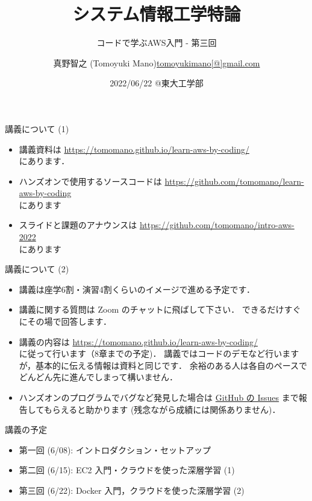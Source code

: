 \documentclass[unicode,11pt]{beamer}
\title{システム情報工学特論}
\subtitle{コードで学ぶAWS入門 - 第三回}
\author[Tomoyuki Mano]{\texorpdfstring{真野智之 (Tomoyuki Mano)\newline\url{tomoyukimano[@]gmail.com}}{Author}}
\institute[OIST]{Okinawa Institute of Science and Technology (OIST)}
\date{2022/06/22 @東大工学部}
\begin{document}
\frame{\titlepage}

\begin{frame}{講義について (1)}
\begin{itemize}
    \item 講義資料は
    \url{https://tomomano.github.io/learn-aws-by-coding/}\\
    にあります．
    \item ハンズオンで使用するソースコードは \url{https://github.com/tomomano/learn-aws-by-coding}\\
    にあります
    \item スライドと課題のアナウンスは
    \url{https://github.com/tomomano/intro-aws-2022}\\
    にあります
\end{itemize}
\end{frame}

\begin{frame}{講義について (2)}
\begin{itemize}
    \item 講義は座学6割・演習4割くらいのイメージで進める予定です．
    \item 講義に関する質問は Zoom のチャットに飛ばして下さい．
    できるだけすぐにその場で回答します．
    \item 講義の内容は
    \url{https://tomomano.github.io/learn-aws-by-coding/}\\
    に従って行います（8章までの予定)．
    講義ではコードのデモなど行いますが，基本的に伝える情報は資料と同じです．
    余裕のある人は各自のペースでどんどん先に進んでしまって構いません．
    \item ハンズオンのプログラムでバグなど発見した場合は
    \href{https://github.com/tomomano/learn-aws-by-coding/issues}{GitHub の Issues}
    まで報告してもらえると助かります (残念ながら成績には関係ありません)．
\end{itemize}

\end{frame}

\begin{frame}{講義の予定}
    \begin{itemize}
        \item 第一回 (6/08): イントロダクション・セットアップ
        \item 第二回 (6/15): EC2 入門・クラウドを使った深層学習 (1)
        \item 第三回 (6/22): Docker 入門，クラウドを使った深層学習 (2)
    \end{itemize}
\end{frame}
\end{document}
